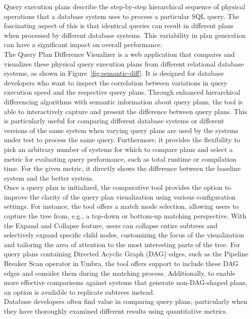 \noindent 
Query execution plans describe the step-by-step hierarchical sequence of physical operations that a database system uses to process a particular SQL query. The fascinating aspect of this is that identical queries can result in different plans when processed by different database systems. This variability in plan generation can have a significant impact on overall performance.
\\The Query Plan Difference Visualizer is a web application that compares and visualizes these physical query execution plans from different relational database systems, as shown in Figure~\ref{fig:semantic-diff}. It is designed for database developers who want to inspect the correlation between variations in query execution speed and the respective query plans. Through enhanced hierarchical differencing algorithms with semantic information about query plans, the tool is able to interactively capture and present  the difference between query plans. This is particularly useful for comparing different database systems or different versions of the same system when varying query plans are used by the systems under test to process the same query. Furthermore, it provides the flexibility to pick an arbitrary number of systems for which to compare plans and select a metric for evaluating query performance, such as total runtime or compilation time. For the given metric, it directly shows the difference between the baseline system and the better system.
\\ Once a query plan is initialized, the comparative tool provides the option to improve the clarity of the query plan visualization using various configuration settings. For instance, the tool offers a match mode selection, allowing users to capture the tree from, e.g., a top-down or bottom-up matching perspective. With the Expand and Collapse feature, users can collapse entire subtrees and selectively expand specific child nodes, customizing the focus of the visualization and tailoring the area of attention to the most interesting parts of the tree.
For query plans containing Directed Acyclic Graph (DAG) edges, such as the Pipeline Breaker Scan operator in Umbra, the tool offers support to include these DAG edges and consider them during the matching process. Additionally, to enable more effective comparisons against systems that generate non-DAG-shaped plans, an option is available to replicate subtrees instead.
\\ Database developers often find value in comparing query plans, particularly when they have thoroughly examined different results using quantitative metrics. 
